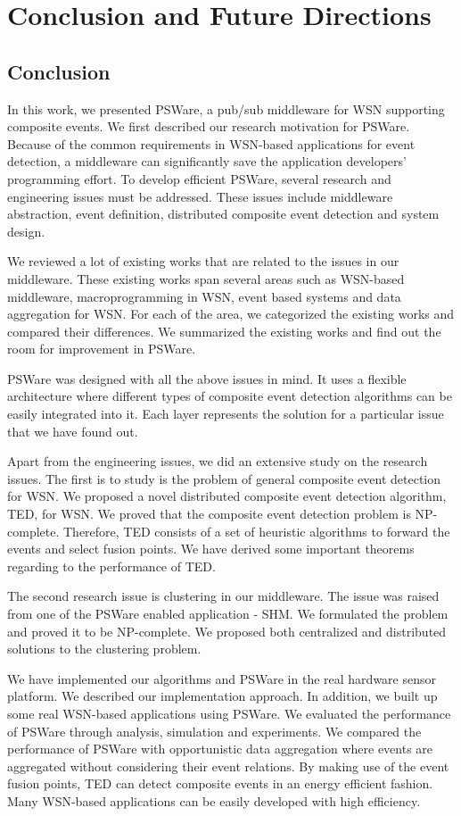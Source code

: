 \chapter{Conclusion and Future Directions}
\label{chapter:conclusion}
\section{Conclusion}
In this work, we presented PSWare, a pub/sub middleware for WSN supporting composite events. We first described our research motivation for PSWare. Because of the common requirements in WSN-based applications for event detection, a middleware can significantly save the application developers' programming effort. To develop efficient PSWare, several research and engineering issues must be addressed. These issues include middleware abstraction, event definition, distributed composite event detection and system design.

We reviewed a lot of existing works that are related to the issues in our middleware. These existing works span several areas such as WSN-based middleware, macroprogramming in WSN, event based systems and data aggregation for WSN. For each of the area, we categorized the existing works and compared their differences. We summarized the existing works and find out the room for improvement in PSWare.

PSWare was designed with all the above issues in mind. It uses a flexible architecture where different types of composite event detection algorithms can be easily integrated into it. Each layer represents the solution for a particular issue that we have found out.

Apart from the engineering issues, we did an extensive study on the research issues. The first is to study is the problem of general composite event detection for WSN. We proposed a novel distributed composite event detection algorithm, TED, for WSN. We proved that the composite event detection problem is NP-complete. Therefore, TED consists of a set of heuristic algorithms to forward the events and select fusion points. We have derived some important theorems regarding to the performance of TED.

The second research issue is clustering in our middleware. The issue was raised from one of the PSWare enabled application - SHM. We formulated the problem and proved it to be NP-complete. We proposed both centralized and distributed solutions to the clustering problem.

We have implemented our algorithms and PSWare in the real hardware sensor platform. We described our implementation approach. In addition, we built up some real WSN-based applications using PSWare. We evaluated the performance of PSWare through analysis, simulation and experiments. We compared the performance of PSWare with opportunistic data aggregation where events are aggregated without considering their event relations. By making use of the event fusion points, TED can detect composite events in an energy efficient fashion. Many WSN-based applications can be easily developed with high efficiency.

